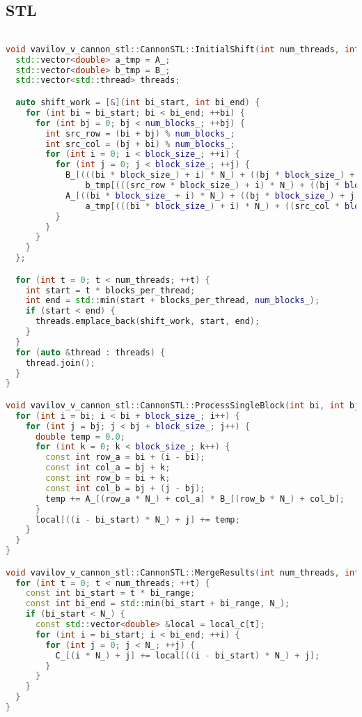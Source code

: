 \documentclass[a4paper,12pt]{article}
\begin{document}
\subsection{STL}
\begin{lstlisting}[language=C++]

void vavilov_v_cannon_stl::CannonSTL::InitialShift(int num_threads, int blocks_per_thread) {
  std::vector<double> a_tmp = A_;
  std::vector<double> b_tmp = B_;
  std::vector<std::thread> threads;

  auto shift_work = [&](int bi_start, int bi_end) {
    for (int bi = bi_start; bi < bi_end; ++bi) {
      for (int bj = 0; bj < num_blocks_; ++bj) {
        int src_row = (bi + bj) % num_blocks_;
        int src_col = (bj + bi) % num_blocks_;
        for (int i = 0; i < block_size_; ++i) {
          for (int j = 0; j < block_size_; ++j) {
            B_[(((bi * block_size_) + i) * N_) + ((bj * block_size_) + j)] =
                b_tmp[(((src_row * block_size_) + i) * N_) + ((bj * block_size_) + j)];
            A_[((bi * block_size_ + i) * N_) + ((bj * block_size_) + j)] =
                a_tmp[(((bi * block_size_) + i) * N_) + ((src_col * block_size_) + j)];
          }
        }
      }
    }
  };

  for (int t = 0; t < num_threads; ++t) {
    int start = t * blocks_per_thread;
    int end = std::min(start + blocks_per_thread, num_blocks_);
    if (start < end) {
      threads.emplace_back(shift_work, start, end);
    }
  }
  for (auto &thread : threads) {
    thread.join();
  }
}

void vavilov_v_cannon_stl::CannonSTL::ProcessSingleBlock(int bi, int bj, int bi_start, std::vector<double> &local) {
  for (int i = bi; i < bi + block_size_; i++) {
    for (int j = bj; j < bj + block_size_; j++) {
      double temp = 0.0;
      for (int k = 0; k < block_size_; k++) {
        const int row_a = bi + (i - bi);
        const int col_a = bj + k;
        const int row_b = bi + k;
        const int col_b = bj + (j - bj);
        temp += A_[(row_a * N_) + col_a] * B_[(row_b * N_) + col_b];
      }
      local[((i - bi_start) * N_) + j] += temp;
    }
  }
}

void vavilov_v_cannon_stl::CannonSTL::MergeResults(int num_threads, int bi_range, const std::vector<std::vector<double>> &local_c) {
  for (int t = 0; t < num_threads; ++t) {
    const int bi_start = t * bi_range;
    const int bi_end = std::min(bi_start + bi_range, N_);
    if (bi_start < N_) {
      const std::vector<double> &local = local_c[t];
      for (int i = bi_start; i < bi_end; ++i) {
        for (int j = 0; j < N_; ++j) {
          C_[(i * N_) + j] += local[((i - bi_start) * N_) + j];
        }
      }
    }
  }
}


\end{lstlisting}
\end{document}
